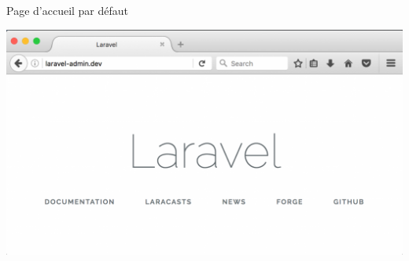 \documentclass{beamer}
\begin{document}
\begin{frame}{Page d'accueil par défaut}
\begin{center}
  \includegraphics[scale=0.4]{images/laravel-welcome-page.png}
\end{center}
\end{frame}
\end{document}
